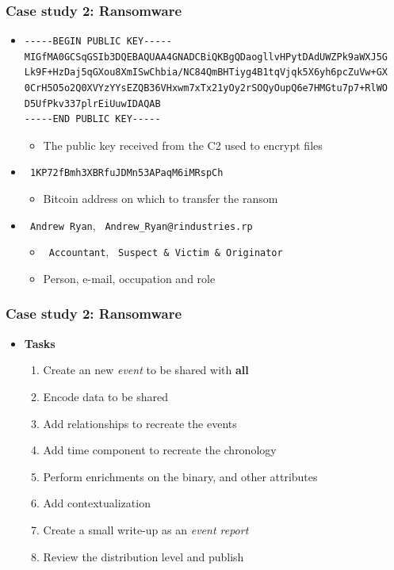 \begin{frame}[fragile]
    \frametitle{Case study 2: Ransomware}
    \begin{itemize}
        \item \begin{lstlisting}
-----BEGIN PUBLIC KEY-----
MIGfMA0GCSqGSIb3DQEBAQUAA4GNADCBiQKBgQDaogllvHPytDAdUWZPk9aWXJ5G
Lk9F+HzDaj5qGXou8XmISwChbia/NC84QmBHTiyg4B1tqVjqk5X6yh6pcZuVw+GX
0CrH5O5o2Q0XVYzYYsEZQB36VHxwm7xTx21yOy2rSOQyOupQ6e7HMGtu7p7+RlWO
D5UfPkv337plrEiUuwIDAQAB
-----END PUBLIC KEY-----
\end{lstlisting}
        \begin{itemize}
            \item The public key received from the C2 used to encrypt files
        \end{itemize}
        \item \texttt{\color{black} 1KP72fBmh3XBRfuJDMn53APaqM6iMRspCh}
        \begin{itemize}
            \item Bitcoin address on which to transfer the ransom
        \end{itemize}
        \item \texttt{\color{black} Andrew Ryan}, \texttt{\color{black} Andrew\_Ryan@rindustries.rp}
        \begin{itemize}
            \item \texttt{\color{black} Accountant}, \texttt{\color{black} Suspect \& Victim \& Originator}
            \item Person, e-mail, occupation and role
        \end{itemize}
    \end{itemize}

\end{frame}

\begin{frame}
    \frametitle{Case study 2: Ransomware}
    \begin{itemize}
        \item[] \textbf{Tasks}
        \begin{enumerate}
            \item Create an new \textit{event} to be shared with \textbf{all}
            \item Encode data to be shared
            \item Add relationships to recreate the events
            \item Add time component to recreate the chronology
            \item Perform enrichments on the binary, and other attributes
            \item Add contextualization
            \item Create a small write-up as an \textit{event report}
            \item Review the distribution level and publish
        \end{enumerate}
    \end{itemize}
\end{frame}

